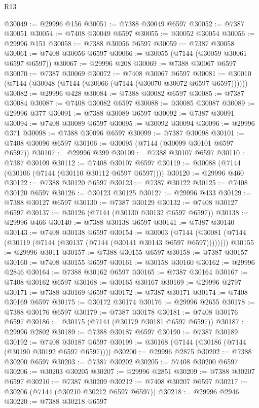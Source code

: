 \begin{lexlean}{R13}
\begin{coremodule}
@30049 := @29996 @156
@30051 := @7388 @30049 @6597
@30052 := @7387 @30051
@30054 := @7408 @30049 @6597
@30055 := @30052 @30054
@30056 := @29996 @151
@30058 := @7388 @30056 @6597
@30059 := @7387 @30058
@30061 := @7408 @30056 @6597
@30066 := @30055 (@7144 (@30059 @30061 @6597 @6597))
@30067 := @29996 @208
@30069 := @7388 @30067 @6597
@30070 := @7387 @30069
@30072 := @7408 @30067 @6597
@30081 := @30010 (@7144 (@30048 (@7144 (@30066 (@7144 (@30070 @30072 @6597 @6597))))))
@30082 := @29996 @428
@30084 := @7388 @30082 @6597
@30085 := @7387 @30084
@30087 := @7408 @30082 @6597
@30088 := @30085 @30087
@30089 := @29996 @377
@30091 := @7388 @30089 @6597
@30092 := @7387 @30091
@30094 := @7408 @30089 @6597
@30095 := @30092 @30094
@30096 := @29996 @371
@30098 := @7388 @30096 @6597
@30099 := @7387 @30098
@30101 := @7408 @30096 @6597
@30106 := @30095 (@7144 (@30099 @30101 @6597 @6597))
@30107 := @29996 @399
@30109 := @7388 @30107 @6597
@30110 := @7387 @30109
@30112 := @7408 @30107 @6597
@30119 := @30088 (@7144 (@30106 (@7144 (@30110 @30112 @6597 @6597))))
@30120 := @29996 @460
@30122 := @7388 @30120 @6597
@30123 := @7387 @30122
@30125 := @7408 @30120 @6597
@30126 := @30123 @30125
@30127 := @29996 @433
@30129 := @7388 @30127 @6597
@30130 := @7387 @30129
@30132 := @7408 @30127 @6597
@30137 := @30126 (@7144 (@30130 @30132 @6597 @6597))
@30138 := @29996 @466
@30140 := @7388 @30138 @6597
@30141 := @7387 @30140
@30143 := @7408 @30138 @6597
@30154 := @30003
    (@7144 (@30081 (@7144 (@30119 (@7144 (@30137 (@7144 (@30141 @30143 @6597 @6597))))))))
@30155 := @29996 @3011
@30157 := @7388 @30155 @6597
@30158 := @7387 @30157
@30160 := @7408 @30155 @6597
@30161 := @30158 @30160
@30162 := @29996 @2846
@30164 := @7388 @30162 @6597
@30165 := @7387 @30164
@30167 := @7408 @30162 @6597
@30168 := @30165 @30167
@30169 := @29996 @2797
@30171 := @7388 @30169 @6597
@30172 := @7387 @30171
@30174 := @7408 @30169 @6597
@30175 := @30172 @30174
@30176 := @29996 @2655
@30178 := @7388 @30176 @6597
@30179 := @7387 @30178
@30181 := @7408 @30176 @6597
@30186 := @30175 (@7144 (@30179 @30181 @6597 @6597))
@30187 := @29996 @2802
@30189 := @7388 @30187 @6597
@30190 := @7387 @30189
@30192 := @7408 @30187 @6597
@30199 := @30168 (@7144 (@30186 (@7144 (@30190 @30192 @6597 @6597))))
@30200 := @29996 @2875
@30202 := @7388 @30200 @6597
@30203 := @7387 @30202
@30205 := @7408 @30200 @6597
@30206 := @30203 @30205
@30207 := @29996 @2851
@30209 := @7388 @30207 @6597
@30210 := @7387 @30209
@30212 := @7408 @30207 @6597
@30217 := @30206 (@7144 (@30210 @30212 @6597 @6597))
@30218 := @29996 @2946
@30220 := @7388 @30218 @6597

\end{coremodule}
\end{lexlean}
